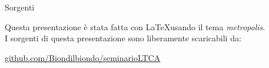 \documentclass[10pt]{beamer}
\begin{document}
\begin{frame}{Sorgenti}

\begin{center}
	Questa presentazione è stata fatta con \LaTeX usando il tema \textit{metropolis}.\\
	I sorgenti di questa presentazione sono liberamente scaricabili da:
\end{center}

\begin{center}\url{github.com/Biondilbiondo/seminarioLTCA}\end{center}

\begin{center}\ccbysa\end{center}

\end{frame}

\appendix
\end{document}
